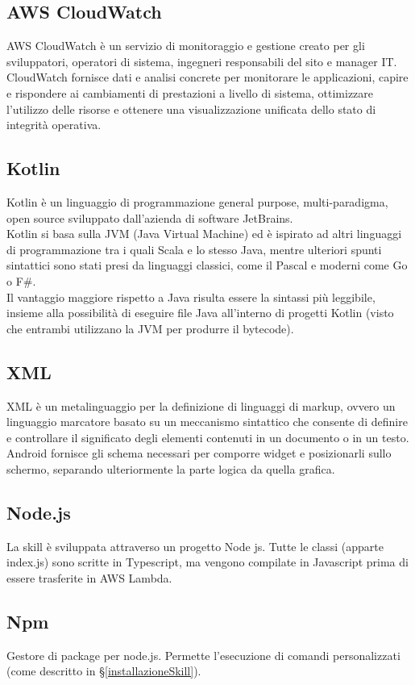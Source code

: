 \subsection{AWS CloudWatch}
AWS CloudWatch è un servizio di monitoraggio e gestione creato per gli sviluppatori, operatori di sistema, ingegneri responsabili del sito e manager IT. CloudWatch fornisce dati e analisi concrete per monitorare le applicazioni, capire e rispondere ai cambiamenti di prestazioni a livello di sistema, ottimizzare l'utilizzo delle risorse e ottenere una visualizzazione unificata dello stato di integrità operativa. 
\subsection{Kotlin}
Kotlin è un linguaggio di programmazione general purpose, multi-paradigma, open source sviluppato dall'azienda di software JetBrains.\\
Kotlin si basa sulla JVM (Java Virtual Machine) ed è ispirato ad altri linguaggi di programmazione tra i quali Scala e lo stesso Java, mentre ulteriori spunti sintattici sono stati presi da linguaggi classici, come il Pascal e moderni come Go o F\#.\\
Il vantaggio maggiore rispetto a Java risulta essere la sintassi più leggibile, insieme alla possibilità di eseguire file Java all'interno di progetti Kotlin (visto che entrambi utilizzano la JVM per produrre il bytecode).

\subsection{XML}
XML è un metalinguaggio per la definizione di linguaggi di markup, ovvero un linguaggio marcatore basato su un meccanismo sintattico che consente di definire e controllare il significato degli elementi contenuti in un documento o in un testo.\\ 
Android fornisce gli schema necessari per comporre widget e posizionarli sullo schermo, separando ulteriormente la parte logica da quella grafica. 

\subsection{Node.js}
La skill è sviluppata attraverso un progetto Node js. Tutte le classi (apparte index.js) sono scritte in Typescript, ma vengono compilate in Javascript prima di essere trasferite in AWS Lambda.
\subsection{Npm}
Gestore di package per node.js. Permette l'esecuzione di comandi personalizzati (come descritto in \S\ref{installazioneSkill}).
